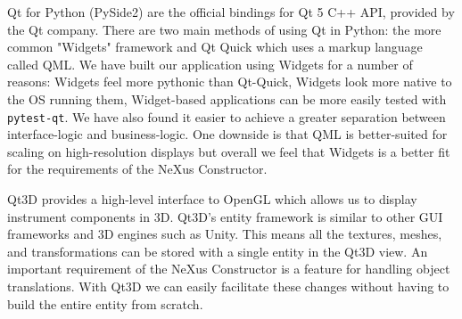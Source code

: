 Qt for Python (PySide2) are the official bindings for Qt 5 C++ API, provided by the Qt company. There are two main methods of using Qt in Python: the more common "Widgets" framework and Qt Quick which uses a markup language called QML. We have built our application using Widgets for a number of reasons: Widgets feel more pythonic than Qt-Quick, Widgets look more native to the OS running them, Widget-based applications can be more easily tested with \texttt{pytest-qt}. We have also found it easier to achieve a greater separation between interface-logic and business-logic. One downside is that QML is better-suited for scaling on high-resolution displays but overall we feel that Widgets is a better fit for the requirements of the NeXus Constructor.

Qt3D provides a high-level interface to OpenGL which allows us to display instrument components in 3D. Qt3D's entity framework is similar to other GUI frameworks and 3D engines such as Unity. This means all the textures, meshes, and transformations can be stored with a single entity in the Qt3D view. An important requirement of the NeXus Constructor is a feature for handling object translations. With Qt3D we can easily facilitate these changes without having to build the entire entity from scratch. 
\iffalse
\bigskip
The code snippet below shows the usage of a typical Qt3D view in python. Qt3D provides some high-level geometry types for adding cylinders, meshes, spheres as well as several other shapes. This is all wrapping OpenGL, and in the future Qt have stated they will support other graphics engines such as DirectX12, Vulkan and Metal. Currently there is some limited support for vulkan using the QVulkanWindow with a QVulkanInstance.
\fi
